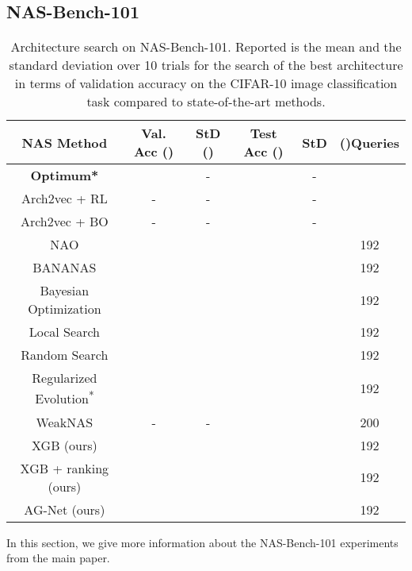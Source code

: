 \documentclass[runningheads]{llncs}
\begin{document}
\subsection{NAS-Bench-101}

\begin{table}[h]
	\scriptsize
	\begin{center}
		\caption{Architecture search on NAS-Bench-101. Reported is the mean and the standard deviation over 10 trials for the search of the best architecture in terms of validation accuracy on the CIFAR-10 image classification task compared to state-of-the-art methods.}
		\label{tab:NB101_Search_supp}
		\begin{tabular}{c||c|c|c|c||c}
			\toprule
			\textbf{NAS Method}  & \textbf{Val. Acc} () & \textbf{StD} ()& \textbf{Test Acc} () &  \textbf{StD} & ()\textbf{Queries} \\
			\midrule
			\textbf{Optimum*} &  & - & & - & \\
			\midrule
			Arch2vec + RL \cite{2020Arch2vec} & - & - &  & - & \\
			Arch2vec + BO \cite{2020Arch2vec}& - & - &  & - & \\
			NAO \textsuperscript{\ddag}\cite{2018NAO} &  &  &
			 &  & 192 \\
			BANANAS\textsuperscript{\textdagger} \cite{2021BANANAS} &  &  &  &  & 192 \\
			Bayesian Optimization\textsuperscript{\textdagger} \cite{2015DNGO}  &  &  &   &  & 192 \\
			Local Search\textsuperscript{\textdagger} \cite{2020LocalSearchNAS}  &  &  &  &  & 192\\
			Random Search\textsuperscript{\textdagger}\cite{2019RS}  &  &  &  &   & 192 \\
			Regularized Evolution\textsuperscript{*}\cite{2019EvolutionaryNAS}  &  &  &  &  & 192 \\
			WeakNAS \cite{2021WeakNAS} & - & - &  &  & 200 \\
			\midrule
			XGB (ours) &  &  &  &  & 192 \\
			XGB + ranking (ours) &  &  &  &  & 192 \\
			AG-Net (ours)  &  &  &  &   & 192
			\\
			\bottomrule
		\end{tabular}
	\end{center}
\end{table}


In this section, we give more information about the NAS-Bench-101 experiments from the main paper. 
\end{document}
